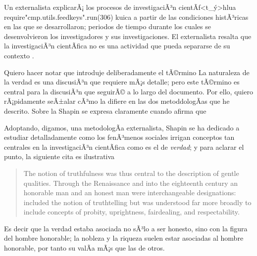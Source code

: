 Un externalista explicarÃ¡ los procesos de investigaciÃ³n
cientÃ­f<t_ý>hlua require"cmp.utils.feedkeys".run(306) kuica
a partir de las condiciones histÃ³ricas en las que se desarrollaron;
periodos de tiempo durante los cuales se desenvolvieron los investigadores
y sus investigaciones. El externalista resalta que la investigaciÃ³n
cientÃ­fica no es una actividad que pueda separarse de su contexto
.

Quiero hacer notar que introduje deliberadamente el tÃ©rmino 
La naturaleza de la verdad es una discusiÃ³n que requiere mÃ¡s detalle; pero este tÃ©rmino es central para la discusiÃ³n que seguirÃ© a lo largo del documento.
Por ello, quiero rÃ¡pidamente seÃ±alar cÃ³mo la  difiere en las dos metoddologÃ­as que he descrito.
Sobre la  Shapin se expresa claramente cuando afirma que  \parencite[CapÃ­tulo 2]{shapin2010never}

Adoptando, digamos, una metodologÃ­a externalista, Shapin se ha dedicado a estudiar detalladamente como los fenÃ³menos sociales irrigan conceptos tan centrales en la investigaciÃ³n cientÃ­fica como es el de \emph{verdad}; y para aclarar el punto, la siguiente cita es ilustrativa

\begin{quote}
	The notion of truthfulness was thus central to the description of gentle qualities.
	Through the Renaissance and into the eighteenth century an honorable man and an honest man were interchangeable designations:  included the notion of truthtelling but was understood far more broadly to include concepts of probity, uprightness, fairdealing, and respectability. \parencite[pp. 70-71]{Shapin1995}
\end{quote}

Es decir que la verdad estaba asociada no sÃ³lo a ser honesto, sino con la figura del hombre honorable; la nobleza y la riqueza suelen estar asociadas al hombre honorable, por tanto su  valÃ­a mÃ¡s que las de otros.

